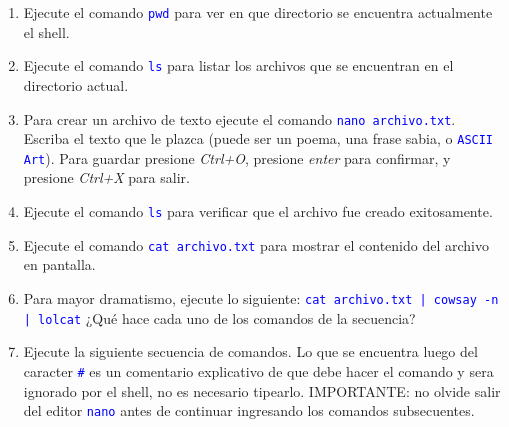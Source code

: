 \documentclass[12pt]{article}
\newcommand{\cw}[1]{\texttt{\textcolor{blue}{#1}}}
\begin{document}
\begin{enumerate}[resume]

    \item Ejecute el comando \cw{pwd} para ver en que directorio se encuentra
        actualmente el shell.

    \item Ejecute el comando \cw{ls} para listar los archivos que se
        encuentran en el directorio actual.

    \item Para crear un archivo de texto ejecute el comando \cw{nano
        archivo.txt}. Escriba el texto que le plazca (puede ser un poema, una
        frase sabia, o \cw{ASCII Art}). Para guardar presione \emph{Ctrl+O},
        presione \emph{enter} para confirmar, y presione \emph{Ctrl+X} para
        salir.

    \item Ejecute el comando \cw{ls} para verificar que el archivo fue creado
        exitosamente.

    \item Ejecute el comando \cw{cat archivo.txt} para mostrar el contenido
        del archivo en pantalla.

    \item Para mayor dramatismo, ejecute lo siguiente: \cw{cat archivo.txt |
        cowsay -n | lolcat} ¿Qué hace cada uno de los comandos de la
        secuencia?

    \item Ejecute la siguiente secuencia de comandos. Lo que se encuentra
        luego del caracter \cw{\#} es un comentario explicativo de que debe
        hacer el comando y sera ignorado por el shell, no es necesario
        tipearlo. IMPORTANTE: no olvide salir del editor \cw{nano} antes de
        continuar ingresando los comandos subsecuentes.

    \begin{center}


\end{center}
\end{enumerate}
\end{document}
